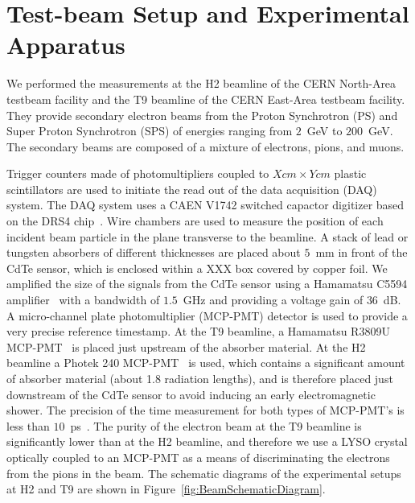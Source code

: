 \section{Test-beam Setup and Experimental Apparatus }
\label{sec:tbeam}

We performed the measurements at the H2 beamline of the CERN North-Area testbeam facility
and the T9 beamline of the CERN East-Area testbeam facility. They provide secondary electron beams 
from the Proton Synchrotron (PS) and Super Proton Synchrotron (SPS)
of energies ranging from $2$~GeV to $200$~GeV. The secondary beams are composed of 
a mixture of electrons, pions, and muons. 

Trigger counters made of photomultipliers coupled to $X \unit{cm}\times Y \unit{cm}$ plastic scintillators
are used 
to initiate the read out of the data acquisition (DAQ) system. The DAQ system
uses a CAEN V1742 switched capactor digitizer based on the DRS4 chip~\cite{DRS}. Wire chambers
are used to measure the position of each incident beam particle in the plane transverse
to the beamline. A stack of lead or tungsten absorbers of different thicknesses are 
placed about $5$~mm in front of the CdTe sensor, which is 
enclosed within a XXX box covered by copper foil. We amplified the size of the
signals from the CdTe sensor using a Hamamatsu C5594 amplifier~\cite{HamaAmpDataSheet} with a bandwidth of
$1.5$~GHz and providing a voltage gain of $36$~dB. A micro-channel plate photomultiplier (MCP-PMT)
detector is used to provide a very precise reference timestamp. At the T9 beamline,
a Hamamatsu R3809U MCP-PMT~\cite{HamaMCPDataSheet} is placed just upstream of the absorber material. 
At the H2 beamline a Photek 240 MCP-PMT~\cite{PhotekDataSheet} is used, which contains a significant 
amount of absorber material (about 1.8 radiation lengths), and is therefore placed 
just downstream of the CdTe sensor to avoid inducing an early electromagnetic shower.
The precision of the time measurement for both types of MCP-PMT's is less than 
$10$~ps~\cite{MCPShowerMaxPaper}. The purity of the electron beam at the T9 beamline is
significantly lower than at the H2 beamline, and therefore we use a LYSO crystal
optically coupled to an MCP-PMT as a means of discriminating the electrons from the pions
in the beam. The schematic diagrams of the experimental setups at H2 and T9 
are shown in Figure~\ref{fig:BeamSchematicDiagram}. 


